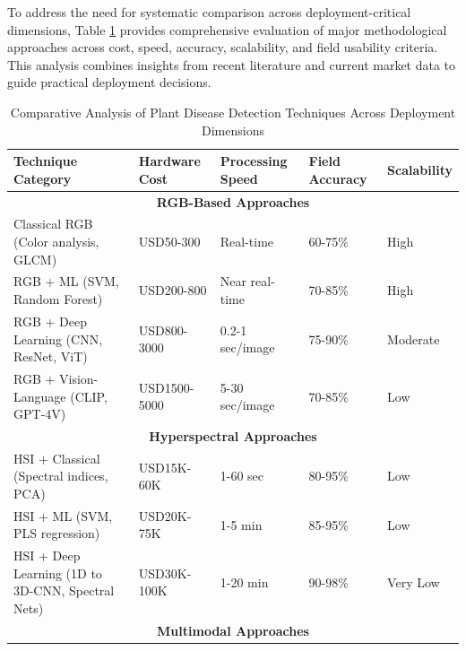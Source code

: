 \documentclass[sn-mathphys]{sn-jnl}
\theoremstyle{thmstyleone}%
\theoremstyle{thmstyletwo}%
\theoremstyle{thmstylethree}%
\begin{document}
To address the need for systematic comparison across deployment-critical dimensions, Table \ref{tab:technique_comparison} provides comprehensive evaluation of major methodological approaches across cost, speed, accuracy, scalability, and field usability criteria. This analysis combines insights from recent literature and current market data to guide practical deployment decisions.
\begin{table}[h!]
\centering
\tiny
\caption{Comparative Analysis of Plant Disease Detection Techniques Across Deployment Dimensions}
\label{tab:technique_comparison}
\begin{tabular}{@{}p{4.5cm}p{1.5cm}p{1.5cm}p{2cm}p{1.5cm}@{}}
\toprule
\textbf{Technique Category} & \textbf{Hardware Cost} & \textbf{Processing Speed} & \textbf{Field Accuracy} & \textbf{Scalability} \\
\midrule
\multicolumn{5}{c}{\textbf{RGB-Based Approaches}} \\
\midrule
Classical RGB (Color analysis, GLCM) & USD50-300 \citep{coptrz2024cost} & Real-time \citep{straits2022hsi} & 60-75\% \citep{arivazhagan2013detection} & High \\
RGB + ML (SVM, Random Forest) & USD200-800 \citep{coptrz2024cost} & Near real-time \citep{hatuwal2020plant} & 70-85\% \citep{qin2016identification} & High \\
RGB + Deep Learning (CNN, ResNet, ViT) & USD800-3000 \citep{coptrz2024cost} & 0.2-1 sec/image \citep{Viel2023time} & 75-90\% \citep{ferentinos2018deep} & Moderate \\
RGB + Vision-Language (CLIP, GPT-4V) & USD1500-5000 \citep{coptrz2024cost} & 5-30 sec/image \citep{zhang2024visual} & 70-85\% \citep{LI2025106981} & Low \\
\midrule
\multicolumn{5}{c}{\textbf{Hyperspectral Approaches}} \\
\midrule
HSI + Classical (Spectral indices, PCA) & USD15K-60K \citep{sph2024hyperspectral} & 1-60 sec \citep{GhamisiHSI} & 80-95\% \citep{abdulridha2020detection} & Low \\
HSI + ML (SVM, PLS regression) & USD20K-75K \citep{sph2024hyperspectral} & 1-5 min \citep{Viel2023time} & 85-95\% \citep{alisaac2018hyperspectral} & Low \\
HSI + Deep Learning (1D to 3D-CNN, Spectral Nets) & USD30K-100K \citep{sph2024hyperspectral} & 1-20 min \citep{Viel2023time,detring2024quality} & 90-98\% \citep{jia2023net} & Very Low \\
\midrule
\multicolumn{5}{c}{\textbf{Multimodal Approaches}} \\

\end{tabular}
\end{table}
\end{document}
